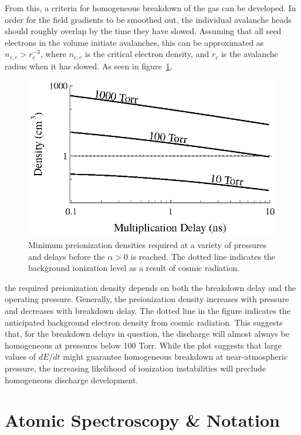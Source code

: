 From this, a criteria for homogeneous breakdown of the gas can be developed. In
order for the field gradients to be smoothed out, the individual avalanche heads
should roughly overlap by the time they have slowed. Assuming that all seed
electrons in the volume initiate avalanches, this can be approximated as
$n_{e,c} > r_c^{-3}$, where $n_{e,c}$ is the critical electron density, and
$r_c$ is the avalanche radius when it has slowed. As seen in
figure~\ref{fig:avalanche_densities},
\begin{figure}
  \centering
  \includegraphics{./chapters/theory/figures/avalanche_densities.eps}
  \caption{Minimum preionization densities required at a variety of pressures
    and delays before the $\alpha > 0$ is reached. The dotted line indicates the
    background ionization level as a result of cosmic radiation.}
  \label{fig:avalanche_densities}
\end{figure}
the required preionization density depends on both the breakdown delay and the
operating pressure. Generally, the preionization density increases with pressure
and decreases with breakdown delay. The dotted line in the figure indicates the
anticipated background electron density from cosmic radiation. This suggests
that, for the breakdown delays in question, the discharge will almost always be
homogeneous at pressures below 100 Torr. While the plot suggests that large
values of $dE/dt$ might guarantee homogeneous breakdown at near-atmospheric
pressure, the increasing likelihood of ionization instabilities \cite{Johns1972}
will preclude homogeneous discharge development.

\section{Atomic Spectroscopy \& Notation}

